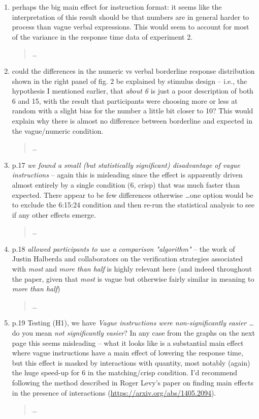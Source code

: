 \documentclass{tufte-handout}
\begin{document}
\begin{enumerate}
\item perhaps the big main effect for instruction format: it seems like the interpretation of this result should be that numbers are in general harder to process than vague verbal expressions. This would seem to account for most of the variance in the response time data of experiment 2.
\begin{quote}\ldots\end{quote}

\item could the differences in the numeric vs verbal borderline response distribution shown in the right panel of fig. 2 be explained by stimulus design -- i.e., the hypothesis I mentioned earlier, that \emph{about 6} is just a poor description of both 6 and 15, with the result that participants were choosing more or less at random with a slight bias for the number a little bit closer to 10? This would explain why there is almost no difference between borderline and expected in the vague/numeric condition.
\begin{quote}\ldots\end{quote}

\item p.17 \emph{we found a small (but statistically significant) disadvantage of vague instructions} -- again this is misleading since the effect is apparently driven almost entirely by a single condition (6, crisp) that was much faster than expected. There appear to be few differences otherwise \ldots one option would be to exclude the 6:15:24 condition and then re-run the statistical analysis to see if any other effects emerge.
\begin{quote}\ldots\end{quote}

\item p.18 \emph{allowed participants to use a comparison "algorithm"} -- the work of Justin Halberda and collaborators on the verification strategies associated with \emph{most} and \emph{more than half} is highly relevant here (and indeed throughout the paper, given that \emph{most} is vague but otherwise fairly similar in meaning to \emph{more than half})
\begin{quote}\ldots\end{quote}

\item p.19 Testing (H1), we have \emph{Vague instructions were non-significantly easier \ldots} do you mean \emph{not significantly easier}? In any case from the graphs on the next page this seems misleading -- what it looks like is a substantial main effect where vague instructions have a main effect of lowering the response time, but this effect is masked by interactions with quantity, most notably (again) the huge speed-up for 6 in the matching/crisp condition. I'd recommend following the method described in Roger Levy's paper on finding main effects in the presence of interactions (\url{https://arxiv.org/abs/1405.2094}).
\begin{quote}\ldots\end{quote}


\end{enumerate}
\end{document}
